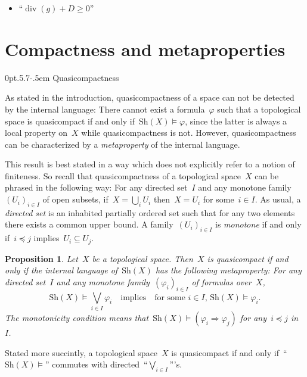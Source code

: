 \documentclass[10pt,reqno,a4paper]{amsbook}
\makeatletter
\theoremstyle{definition}
\theoremstyle{plain}
\newtheorem{prop}[defn]{Proposition}
\theoremstyle{remark}
\newcommand{\Sh}{\mathrm{Sh}}
\newcommand{\?}{\,{:}\,}
\renewcommand{\_}{\mathpunct{.}\,}
\def\subsection{\@startsection{subsection}{2}%
  {0pt}{.5\linespacing\@plus.7\linespacing}{-.5em}%
  {\normalfont\bfseries}}
\makeatother
\begin{document}
\begin{itemize}
\item ``$\operatorname{div}(g) + D \geq 0$''
\end{itemize}


\section{Compactness and metaproperties}
\label{sect:compactness}

\subsection{Quasicompactness}

As stated in the introduction, quasicompactness of a space can not be detected
by the internal language: There cannot exist a formula~$\varphi$ such that a
topological space is quasicompact if and only if~$\Sh(X) \models \varphi$,
since the latter is always a local property on~$X$ while quasicompactness is not.
However, quasicompactness can be characterized by a \emph{metaproperty} of the
internal language.

This result is best stated in a way which does not explicitly refer to a notion
of finiteness. So recall that quasicompactness of a topological space~$X$ can
be phrased in the following way: For any directed set~$I$ and any monotone
family~$(U_i)_{i \in I}$ of open subsets, if~$X = \bigcup_i U_i$ then~$X = U_i$
for some~$i \in I$. As usual, a \emph{directed set} is an inhabited partially
ordered set such that for any two elements there exists a common upper bound.
A family~$(U_i)_{i \in I}$ is \emph{monotone} if and only if~$i \preceq j$
implies~$U_i \subseteq U_j$.

\begin{prop}\label{prop:quasicompact-meta}
Let~$X$ be a topological space. Then~$X$ is quasicompact if and
only if the internal language of~$\Sh(X)$ has the following metaproperty:
For any directed set~$I$ and any monotone family~$(\varphi_i)_{i \in I}$ of
formulas over~$X$,
\[ \Sh(X) \models \bigvee_{i \in I} \varphi_i
  \quad\text{implies}\quad
  \text{for some~$i \in I$, $\Sh(X) \models \varphi_i$}. \]
The monotonicity condition means that~$\Sh(X) \models (\varphi_i \Rightarrow
\varphi_j)$ for any~$i \preceq j$ in~$I$.
\end{prop}

Stated more succintly, a topological space~$X$ is quasicompact if and only
if~``$\Sh(X) \models$'' commutes with directed~``$\bigvee_{i \in I}$'''s.
\end{document}
